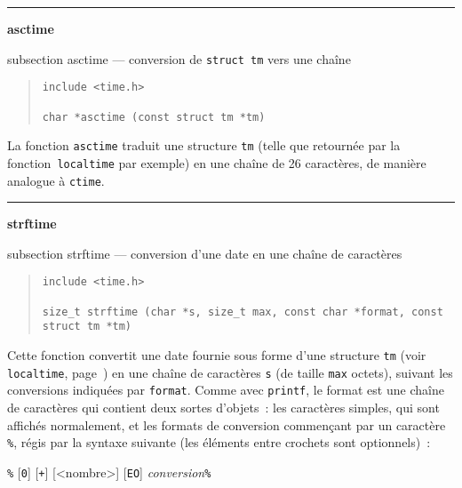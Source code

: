 \documentclass [twoside] {report}
\newcommand {\primitive} [1]
    {
	\phantomsection
	{\large \bf #1}
	\addcontentsline {toc} {subsection} {#1}
    }
\newcommand {\separation}
    {
	\vspace {5mm}
	\nopagebreak
	\hrule
    }
\begin{document}
\separation
\primitive {asctime} --- conversion de \texttt {struct tm} vers une chaîne

\begin {quote}
\begin {verbatim}
include <time.h>

char *asctime (const struct tm *tm)
\end{verbatim}
\end {quote}


La fonction {\tt asctime} traduit une structure \texttt {tm} (telle que
retournée par la fonction~\texttt {localtime} par exemple) en une chaîne
de 26 caractères, de manière analogue à \texttt {ctime}.


\separation
\primitive {strftime} --- conversion d'une date en une chaîne de caractères

\begin {quote}
\begin {verbatim}
include <time.h>

size_t strftime (char *s, size_t max, const char *format, const struct tm *tm)
\end{verbatim}
\end {quote}

Cette fonction convertit une date fournie sous forme d'une structure
\texttt {tm} (voir \texttt {localtime}, page~\pageref {struct-tm}) en
une chaîne de caractères \texttt {s} (de taille \texttt {max} octets),
suivant les conversions indiquées par \texttt {format}.
Comme avec \texttt {printf}, le format est une chaîne de caractères
qui contient deux sortes d'objets~:  les caractères simples, qui sont
affichés normalement, et les formats de conversion commençant par un
caractère {\tt \%}, régis par la syntaxe suivante (les éléments entre
crochets sont optionnels)~:

{\tt \%} [{\tt 0}] [{\tt +}] [<nombre>] [\texttt {E}\texttt {O}] \textit {conversion}\texttt {\%}
\end{document}
